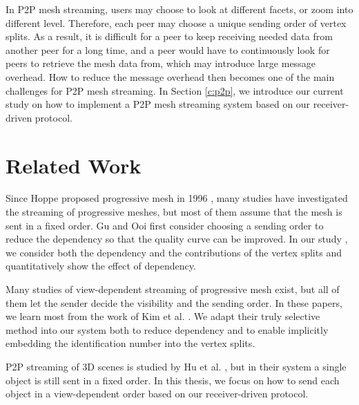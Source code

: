 \documentclass{sig-alt-release2}
\begin{document}
    In P2P mesh streaming, users %
    may choose to look at different facets, or zoom into different level.
    Therefore, each peer may choose a unique sending order of
    vertex splits. As a result, it is difficult for a peer to keep receiving
    needed data from another peer for a long time, and  
    a peer would have to continuously 
    look for peers to retrieve the mesh data from, which may introduce large
    message overhead.
    How to reduce the message overhead then becomes
    one of the main challenges for
    P2P mesh streaming. In Section \ref{c:p2p}, we introduce our current study on how to 
    implement a P2P mesh streaming system based on our receiver-driven protocol.
\section{Related Work}
    Since Hoppe proposed progressive mesh in 1996 \cite{237216}, many studies have
    investigated the streaming of progressive meshes, but most of them assume that the mesh
    is sent in a fixed order. Gu and Ooi \cite{Gu:Packetization} first consider choosing 
    a sending order to reduce the dependency so that the quality curve can be 
    improved. In our study \cite{cheng07analytical}, 
    we consider both the dependency and the contributions of the 
    vertex splits and quantitatively show the effect of dependency.
    
    Many studies of view-dependent streaming of progressive mesh exist, but all of
    them let the sender decide the visibility and the sending order. In these papers,
    we learn most from the work of Kim et al. \cite{kim01truly,multiresolution:kim}.
    We adapt their truly selective method into our
    system both to reduce dependency and to enable implicitly embedding the identification number 
    into the vertex splits.  
    
    P2P streaming of 3D scenes is studied by Hu et al. \cite{Hu2008}, 
    but in their system a single object is still sent in a fixed order.
    In this thesis, we focus on how to send each object in a view-dependent order
    based on our receiver-driven protocol.  
    
\end{document}
